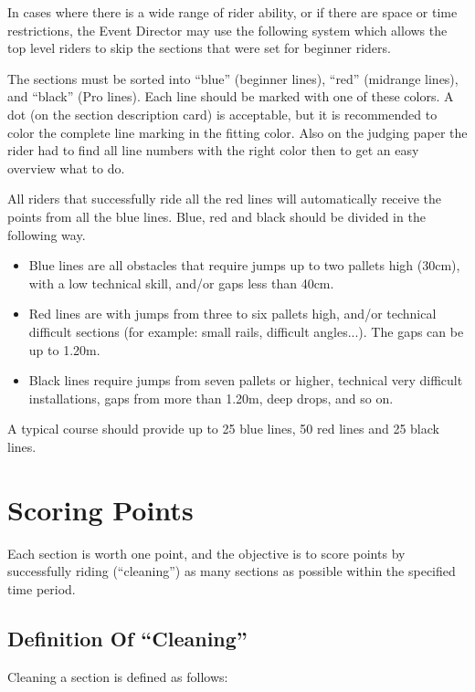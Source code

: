 In cases where there is a wide range of rider ability, or if there are space or time restrictions, the Event Director may use the following system which allows the top level riders to skip the sections that were set for beginner riders.

The sections must be sorted into ``blue'' (beginner lines), ``red'' (midrange lines), and ``black'' (Pro lines). 
Each line should be marked with one of these colors. 
A dot (on the section description card) is acceptable, but it is recommended to color the complete line marking in the fitting color. 
Also on the judging paper the rider had to find all line numbers with the right color then to get an easy overview what to do.

All riders that successfully ride all the red lines will automatically receive the points from all the blue lines.
Blue, red and black should be divided in the following way.
\begin{itemize}
\item Blue lines are all obstacles that require jumps up to two pallets high (30cm), with a low technical skill, and/or gaps less than 40cm.
\item Red lines are with jumps from three to six pallets high, and/or technical difficult sections (for example: small rails, difficult angles...). The gaps can be up to 1.20m.
\item Black lines require jumps from seven pallets or higher, technical very difficult installations, gaps from more than 1.20m, deep drops, and so on. 
\end{itemize}
A typical course should provide up to 25 blue lines, 50 red lines and 25 black lines.


\section{Scoring Points}
Each section is worth one point, and the objective is to score points by successfully riding (``cleaning'') as many sections as possible within the specified time period.

\subsection{Definition Of ``Cleaning''}
Cleaning a section is defined as follows:

